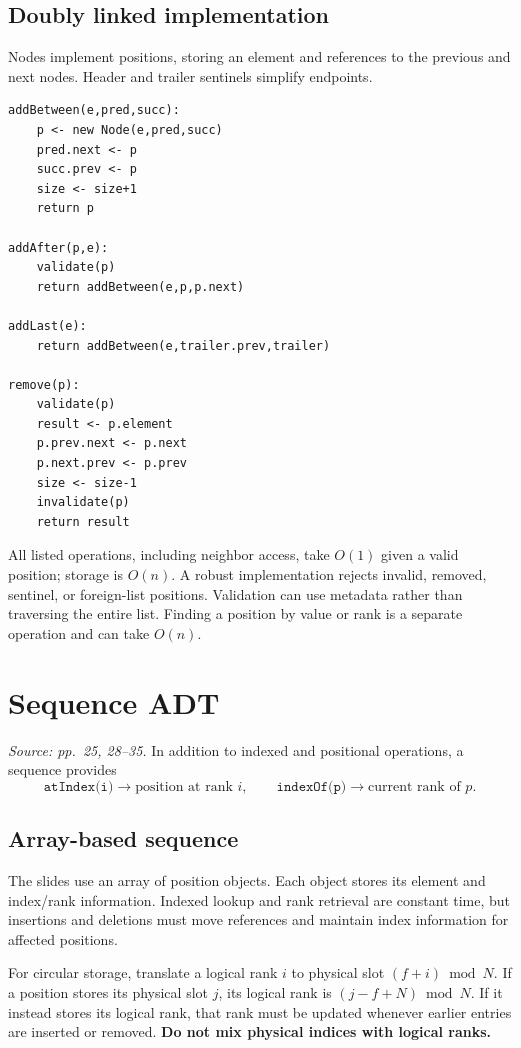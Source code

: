 \documentclass[11pt]{article}
\begin{document}
\subsection{Doubly linked implementation}
Nodes implement positions, storing an element and references to the previous and next nodes. Header and trailer sentinels simplify endpoints.
\begin{lstlisting}
addBetween(e,pred,succ):
    p <- new Node(e,pred,succ)
    pred.next <- p
    succ.prev <- p
    size <- size+1
    return p

addAfter(p,e):
    validate(p)
    return addBetween(e,p,p.next)

addLast(e):
    return addBetween(e,trailer.prev,trailer)

remove(p):
    validate(p)
    result <- p.element
    p.prev.next <- p.next
    p.next.prev <- p.prev
    size <- size-1
    invalidate(p)
    return result
\end{lstlisting}
All listed operations, including neighbor access, take $O(1)$ given a valid position; storage is $O(n)$. A robust implementation rejects invalid, removed, sentinel, or foreign-list positions. Validation can use metadata rather than traversing the entire list. Finding a position by value or rank is a separate operation and can take $O(n)$.

\section{Sequence ADT}
\textit{Source: pp.\ 25, 28--35.}
In addition to indexed and positional operations, a sequence provides
\[
\texttt{atIndex(i)}\longrightarrow\text{position at rank }i,
\qquad
\texttt{indexOf(p)}\longrightarrow\text{current rank of }p.
\]

\subsection{Array-based sequence}
The slides use an array of position objects. Each object stores its element and index/rank information. Indexed lookup and rank retrieval are constant time, but insertions and deletions must move references and maintain index information for affected positions.

For circular storage, translate a logical rank $i$ to physical slot $(f+i)\bmod N$. If a position stores its physical slot $j$, its logical rank is $(j-f+N)\bmod N$. If it instead stores its logical rank, that rank must be updated whenever earlier entries are inserted or removed. \textbf{Do not mix physical indices with logical ranks.}
\end{document}
